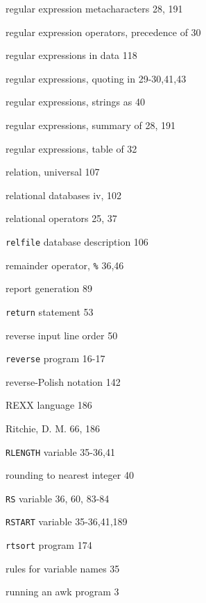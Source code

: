 \begin{multicols}{3}
\hangindent=3pc  regular expression metacharacters 28, 191

\hangindent=3pc  regular expression operators, precedence of 30

\hangindent=3pc  regular expressions in data 118

\hangindent=3pc  regular expressions, quoting in 29-30,41,43

\hangindent=3pc  regular expressions, strings as 40

\hangindent=3pc  regular expressions, summary of 28, 191

\hangindent=3pc  regular expressions, table of 32

\hangindent=3pc  relation, universal 107

\hangindent=3pc  relational databases iv, 102

\hangindent=3pc  relational operators 25, 37

\hangindent=3pc  \verb'relfile' database description 106

\hangindent=3pc  remainder operator, \verb'%' 36,46

\hangindent=3pc  report generation 89

\hangindent=3pc  \verb'return' statement 53

\hangindent=3pc  reverse input line order 50

\hangindent=3pc  \verb'reverse' program 16-17

\hangindent=3pc  reverse-Polish notation 142

\hangindent=3pc  REXX language 186

\hangindent=3pc  Ritchie, D. M. 66, 186

\hangindent=3pc  \verb'RLENGTH' variable 35-36,41

\hangindent=3pc  rounding to nearest integer 40

\hangindent=3pc  \verb'RS' variable 36, 60, 83-84

\hangindent=3pc  \verb'RSTART' variable 35-36,41,189

\hangindent=3pc  \verb'rtsort' program 174

\hangindent=3pc  rules for variable names 35

\hangindent=3pc  running an awk program 3


\end{multicols}
